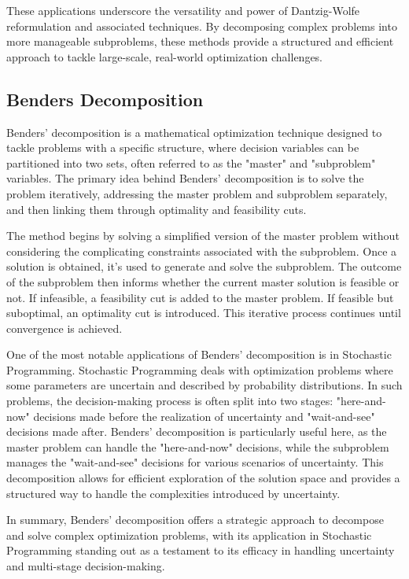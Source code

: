 These applications underscore the versatility and power of Dantzig-Wolfe reformulation and associated techniques. By decomposing complex problems into more manageable subproblems, these methods provide a structured and efficient approach to tackle large-scale, real-world optimization challenges.

\subsection{Benders Decomposition}

Benders' decomposition is a mathematical optimization technique designed to tackle problems with a specific structure, where decision variables can be partitioned into two sets, often referred to as the "master" and "subproblem" variables. The primary idea behind Benders' decomposition is to solve the problem iteratively, addressing the master problem and subproblem separately, and then linking them through optimality and feasibility cuts.

The method begins by solving a simplified version of the master problem without considering the complicating constraints associated with the subproblem. Once a solution is obtained, it's used to generate and solve the subproblem. The outcome of the subproblem then informs whether the current master solution is feasible or not. If infeasible, a feasibility cut is added to the master problem. If feasible but suboptimal, an optimality cut is introduced. This iterative process continues until convergence is achieved.

One of the most notable applications of Benders' decomposition is in Stochastic Programming. Stochastic Programming deals with optimization problems where some parameters are uncertain and described by probability distributions. In such problems, the decision-making process is often split into two stages: "here-and-now" decisions made before the realization of uncertainty and "wait-and-see" decisions made after. Benders' decomposition is particularly useful here, as the master problem can handle the "here-and-now" decisions, while the subproblem manages the "wait-and-see" decisions for various scenarios of uncertainty. This decomposition allows for efficient exploration of the solution space and provides a structured way to handle the complexities introduced by uncertainty.

In summary, Benders' decomposition offers a strategic approach to decompose and solve complex optimization problems, with its application in Stochastic Programming standing out as a testament to its efficacy in handling uncertainty and multi-stage decision-making.

